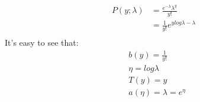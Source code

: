\begin{answer}
\begin{align*}
    P(y;\lambda) &= \frac{e^{-\lambda}\lambda^y}{y!}\\
    &= \frac{1}{y!}e^{y log\lambda-\lambda}\\
\end{align*}
It's easy to see that:
\begin{align*}
    &b(y) = \frac{1}{y!}\\
    &\eta = log\lambda\\
    &T(y) = y\\
    &a(\eta) = \lambda = e^\eta\\
\end{align*}
\end{answer}

